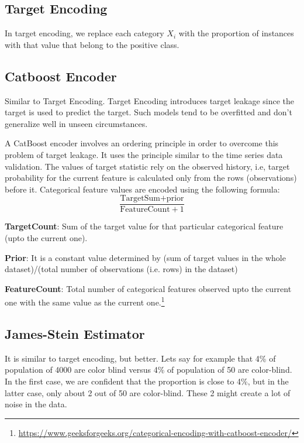 \documentclass{article}
\begin{document}
\subsection*{Target Encoding}
In target encoding, we replace each category $X_i$ with the proportion of instances with that value that belong to the positive class. 

\subsection*{Catboost Encoder}
Similar to Target Encoding. Target Encoding introduces target leakage since the target is used to predict the target. Such models tend to be overfitted and don't generalize well in unseen circumstances.

\noindent A CatBoost encoder involves an ordering principle in order to overcome this problem of target leakage. It uses the principle similar to the time series data validation. The values of target statistic rely on the observed history, i.e, target probability for the current feature is calculated only from the rows (observations) before it. Categorical feature values are encoded using the following formula:
\begin{equation}
\frac{\text{TargetSum} + \text{prior}}{\text{FeatureCount} + 1}
\end{equation}

\noindent \textbf{TargetCount}:  Sum of the target value for that particular categorical feature (upto the current one).

\noindent \textbf{Prior}: It is a constant value determined by (sum of target values in the whole dataset)/(total number of observations (i.e. rows) in the dataset)

\noindent \textbf{FeatureCount}: Total number of categorical features observed upto the current one with the same value as the current one.\footnote{\url{https://www.geeksforgeeks.org/categorical-encoding-with-catboost-encoder/}}

\subsection*{James-Stein Estimator}
It is similar to target encoding, but better. Lets say for example that 4\% of population of 4000 are color blind versus 4\% of population of 50 are color-blind. In the first case, we are confident that the proportion is close to 4\%, but in the latter case, only about 2 out of 50 are color-blind. These 2 might create a lot of noise in the data.
\end{document}
